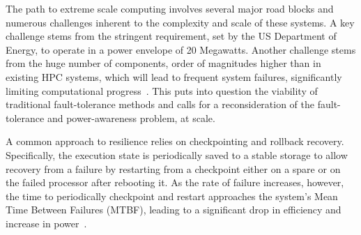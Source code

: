 
The path to extreme scale computing involves several major road blocks and numerous challenges inherent to the complexity and scale of these systems. A key challenge stems from the stringent requirement, set by the US Department of Energy, to operate in a power envelope of 20 Megawatts. Another challenge stems from the huge number of components, order of magnitudes higher than in existing HPC systems, which will lead to frequent system failures, significantly limiting computational progress~\cite{Bergman08exascalecomputing}. This puts into question the viability of traditional fault-tolerance methods and calls for a reconsideration of the fault-tolerance and power-awareness problem, at scale.

A common approach to resilience relies on checkpointing and rollback recovery. Specifically, the execution state is periodically saved to a stable storage to allow recovery from a failure by restarting from a checkpoint either on a spare or on the failed processor after rebooting it. As the rate of failure increases, however, the time to periodically checkpoint and restart approaches the system's Mean Time Between Failures (MTBF), leading to a significant drop in efficiency and increase in power~\cite{4367962,1350776}. %

